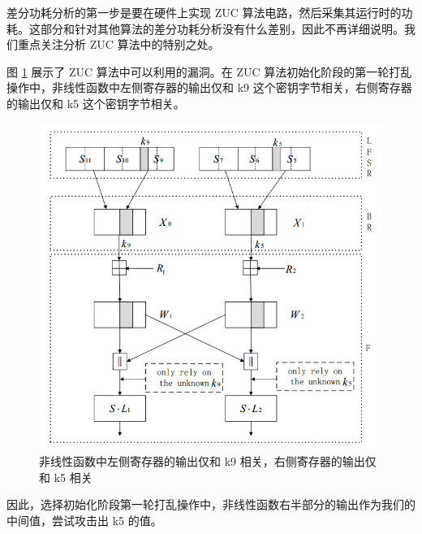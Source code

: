 \vspace*{0.5\baselineskip}

差分功耗分析的第一步是要在硬件上实现 ZUC 算法电路，然后采集其运行时的功耗。这部分和针对其他算法的差分功耗分析没有什么差别，因此不再详细说明。我们重点关注分析 ZUC 算法中的特别之处。

\vspace*{0.5\baselineskip}

图 \ref{fig:zuc_attack} 展示了 ZUC 算法中可以利用的漏洞。在 ZUC 算法初始化阶段的第一轮打乱操作中，非线性函数中左侧寄存器的输出仅和 k9 这个密钥字节相关，右侧寄存器的输出仅和 k5 这个密钥字节相关。 \cite{zuc_attack_tangming}

\begin{figure}[htbp]
    \centering
    \includegraphics[height=.5\textheight]{../images/zuc_attack.png}
    \caption{非线性函数中左侧寄存器的输出仅和 k9 相关，右侧寄存器的输出仅和 k5 相关\cite{zuc_attack_tangming}}
    \label{fig:zuc_attack}

\end{figure}

因此，选择初始化阶段第一轮打乱操作中，非线性函数右半部分的输出作为我们的中间值，尝试攻击出 k5 的值。

\vspace*{\baselineskip}





